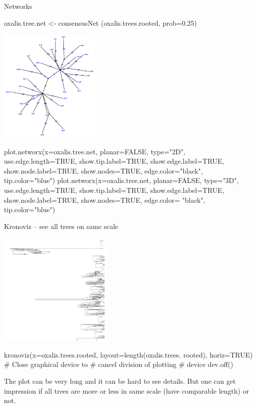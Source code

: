 \documentclass[compress, ucs, xelatex, 11pt, xcolor=svgnames,
  hyperref={
    bookmarks=true,
    unicode=true,
    colorlinks=true,
    pdftitle={Molecular data in R},
    plainpages=false,
    pdfauthor={Vojtech Zeisek},
    pdfsubject={Course about phylogeny and evolution in R},
    pdfcreator={XeLaTeX},
    pdfkeywords={R, evolution, phylogeny, molecular data},
    linkcolor=Tomato,
    anchorcolor=SaddleBrown,
    citecolor=Goldenrod,
    filecolor=DarkMagenta,
    menucolor=Sienna,
    urlcolor=DarkTurquoise,
    pdftex},
  url={hyphens, lowtilde} %
  ]{beamer}
\begin{document}
\begin{frame}[fragile]{Networks}
\begin{multicols}{2}
  \begin{spluscode}
    oxalis.tree.net <- consensusNet
      (oxalis.trees.rooted, prob=0.25)
  \end{spluscode}
  \includegraphics[height=5.5cm]{oxalis-net.png}
  \columnbreak
  \begin{spluscode}
    plot.networx(x=oxalis.tree.net,
      planar=FALSE, type="2D",
      use.edge.length=TRUE,
      show.tip.label=TRUE,
      show.edge.label=TRUE,
      show.node.label=TRUE,
      show.nodes=TRUE,
      edge.color="black",
      tip.color="blue")
    plot.networx(x=oxalis.tree.net,
      planar=FALSE, type="3D",
      use.edge.length=TRUE,
      show.tip.label=TRUE,
      show.edge.label=TRUE,
      show.node.label=TRUE,
      show.nodes=TRUE, edge.color=
      "black", tip.color="blue")
  \end{spluscode}
\end{multicols}
\end{frame}

\begin{frame}[fragile]{Kronoviz -- see all trees on same scale}
\begin{multicols}{2}
  \includegraphics[height=5.5cm]{kronoviz.png}
  \columnbreak
  \begin{spluscode}
    kronoviz(x=oxalis.trees.rooted,
      layout=length(oxalis.trees.
      rooted), horiz=TRUE)
    # Close graphical device to
    # cancel division of plotting
    # device
    dev.off()
  \end{spluscode}
  \vfill
  The plot can be very long and it can be hard to see details. But one can get impression if all trees are more or less in same scale (have comparable length) or not.
\end{multicols}
\end{frame}
\end{document}
